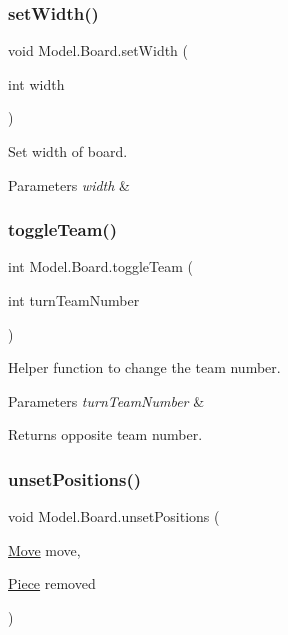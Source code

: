 \subsubsection{\texorpdfstring{set\+Width()}{setWidth()}}
{\footnotesize\ttfamily void Model.\+Board.\+set\+Width (\begin{DoxyParamCaption}\item[{int}]{width }\end{DoxyParamCaption})}

Set width of board. 
\begin{DoxyParams}{Parameters}
{\em width} & \\
\hline
\end{DoxyParams}
\hypertarget{class_model_1_1_board_a6fac52f7cf767e242f6d202a9e52eb8c}{}\label{class_model_1_1_board_a6fac52f7cf767e242f6d202a9e52eb8c} 
\subsubsection{\texorpdfstring{toggle\+Team()}{toggleTeam()}}
{\footnotesize\ttfamily int Model.\+Board.\+toggle\+Team (\begin{DoxyParamCaption}\item[{int}]{turn\+Team\+Number }\end{DoxyParamCaption})}

Helper function to change the team number. 
\begin{DoxyParams}{Parameters}
{\em turn\+Team\+Number} & \\
\hline
\end{DoxyParams}
\begin{DoxyReturn}{Returns}
opposite team number. 
\end{DoxyReturn}
\hypertarget{class_model_1_1_board_a6c918896308d9752d1e81989766c6bee}{}\label{class_model_1_1_board_a6c918896308d9752d1e81989766c6bee} 
\subsubsection{\texorpdfstring{unset\+Positions()}{unsetPositions()}}
{\footnotesize\ttfamily void Model.\+Board.\+unset\+Positions (\begin{DoxyParamCaption}\item[{\hyperlink{class_model_1_1_move}{Move}}]{move,  }\item[{\hyperlink{class_model_1_1_pieces_1_1_piece}{Piece}}]{removed }\end{DoxyParamCaption})}

